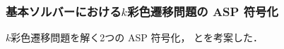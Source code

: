 \documentclass[dvipdfmx,11pt]{beamer}
\begin{document}
\begin{frame}\frametitle{基本ソルバーにおける$k$彩色遷移問題の ASP 符号化}

  $k$彩色遷移問題を解く2つの ASP 符号化，
  とを考案した．

  \begin{exampleblock}{}\centering
    
  \end{exampleblock}


\end{frame}
\end{document}
